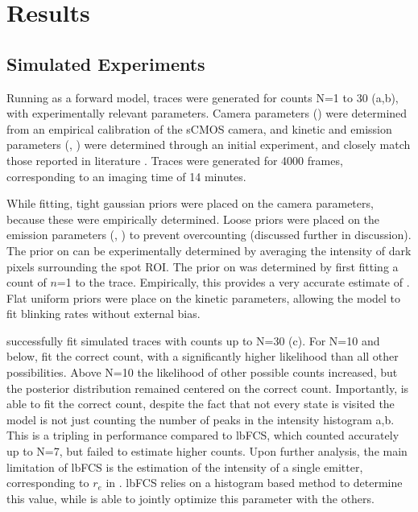 \section{Results}






\subsection{Simulated Experiments}
Running \ours as a forward model, traces were generated for counts N=1 to 30
	(a,b), with experimentally relevant parameters. 
	Camera parameters (\parametersc) were determined from an empirical calibration of the
	sCMOS camera, and kinetic and emission parameters (\parameterst, \parameterse) were determined through an
	initial experiment, and closely match those reported in literature \cite{stein_2021}.
	Traces were generated for 4000 frames, corresponding to an imaging time of 14 minutes.

While fitting, tight gaussian priors were placed on the camera parameters, because these were empirically determined.
	Loose priors were placed on the emission parameters (\rb, \re) to prevent overcounting (discussed further in discussion). 
	The prior on \rb can be experimentally determined by averaging the intensity of dark pixels surrounding the spot ROI.
	The prior on \re was determined by first fitting a count of $n$=1 to the trace. 
	Empirically, this provides a very accurate estimate of \re.
	Flat uniform priors were place on the kinetic parameters, allowing the model to fit blinking rates without external bias.

\ours successfully fit simulated traces with counts up to N=30 (c).
	For N=10 and below, \ours fit the correct count, with a significantly higher likelihood than all other possibilities. 
	Above N=10 the likelihood of other possible counts increased, but the posterior distribution remained centered on the correct count.
	Importantly, \ours is able to fit the correct count,
	despite the fact that not every state is visited \ie the model is not just counting the number of peaks in the intensity histogram a,b.
	This is a tripling in performance compared to lbFCS, which counted accurately up to N=7, but failed to estimate higher counts.
	Upon further analysis, the main limitation of lbFCS is the estimation of the intensity of a single emitter, corresponding to $r_e$ in \ours. 
	lbFCS relies on a histogram based method to determine this value, while \ours is able to jointly optimize this parameter with the others.

